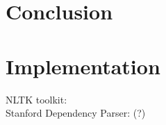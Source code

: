 \documentclass[a4paper, 11pt]{report}
\theoremstyle{definition}
\theoremstyle{plain}
\begin{document}
%
% 




%
%

\chapter{Conclusion}

%
%



%
%

\appendix
\chapter{Implementation}
\label{appendix:impl}

NLTK toolkit: \cite{bird2009natural}\\
Stanford Dependency Parser: \cite{de2008stanford}(?)

%
%
\end{document}
